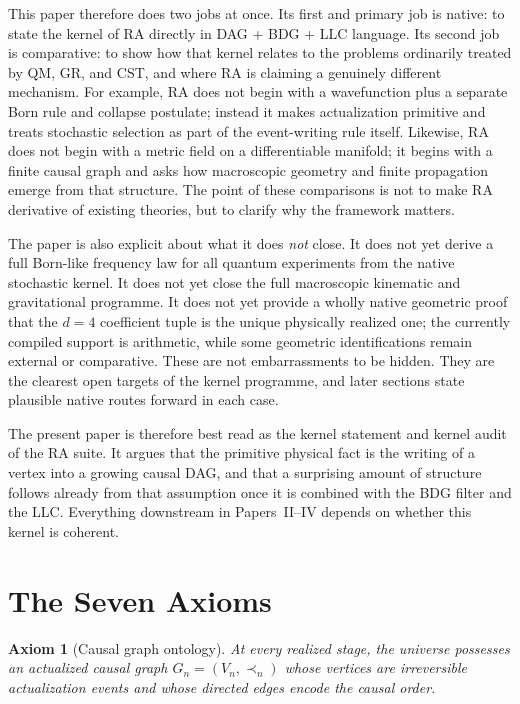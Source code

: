 \documentclass[11pt]{article}
\newtheorem{axiom}{Axiom}
\begin{document}
This paper therefore does two jobs at once. Its first and primary job is native: to state the kernel of RA directly in DAG + BDG + LLC language. Its second job is comparative: to show how that kernel relates to the problems ordinarily treated by QM, GR, and CST, and where RA is claiming a genuinely different mechanism. For example, RA does not begin with a wavefunction plus a separate Born rule and collapse postulate; instead it makes actualization primitive and treats stochastic selection as part of the event-writing rule itself. Likewise, RA does not begin with a metric field on a differentiable manifold; it begins with a finite causal graph and asks how macroscopic geometry and finite propagation emerge from that structure. The point of these comparisons is not to make RA derivative of existing theories, but to clarify why the framework matters.

The paper is also explicit about what it does \emph{not} close. It does not yet derive a full Born-like frequency law for all quantum experiments from the native stochastic kernel. It does not yet close the full macroscopic kinematic and gravitational programme. It does not yet provide a wholly native geometric proof that the $d=4$ coefficient tuple is the unique physically realized one; the currently compiled support is arithmetic, while some geometric identifications remain external or comparative. These are not embarrassments to be hidden. They are the clearest open targets of the kernel programme, and later sections state plausible native routes forward in each case.

The present paper is therefore best read as the kernel statement and kernel audit of the RA suite. It argues that the primitive physical fact is the writing of a vertex into a growing causal DAG, and that a surprising amount of structure follows already from that assumption once it is combined with the BDG filter and the LLC. Everything downstream in Papers~II--IV depends on whether this kernel is coherent.

\section{The Seven Axioms}

\label{sec:axioms}

\begin{axiom}[Causal graph ontology]
\label{ax:graph}
At every realized stage, the universe possesses an actualized causal graph $G_n=(V_n,\prec_n)$ whose vertices are irreversible actualization events and whose directed edges encode the causal order.
\end{axiom}
\end{document}
